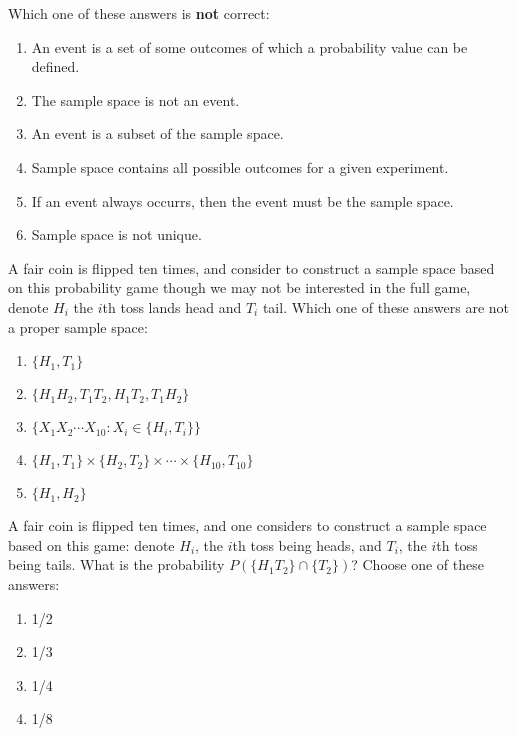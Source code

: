 \documentclass[poll_tutorial_format]{subfiles}
\begin{document}
	\begin{exercise}
	Which one of these answers is \textbf{not} correct: 
	\begin{enumerate}
		\item An event is a set of some outcomes of which a probability value can be defined.
		\item The sample space is not an event.
		\item An event is a subset of the sample space.
		\item Sample space contains all possible outcomes for a given experiment.
		\item If an event always occurrs, then the event must be the sample space.
		\item Sample space is not unique.
	\end{enumerate}
\end{exercise}

	
	\begin{exercise}
		A fair coin is flipped ten times, and  consider to construct a sample space based on this probability game though we may not be interested in the full game, denote $H_i$ the $i$th toss lands head and $T_i$ tail. 
		Which one of these answers are not a proper sample space:
		\begin{enumerate}
			\item $\{H_1, T_1\}$
			\item $\{H_1H_2, T_1T_2, H_1T_2, T_1H_2\}$
			\item $\{X_1X_2\cdots X_{10}: X_i \in \{H_i,T_i\}\}$
			\item $\{H_1, T_1\}\times\{H_2, T_2\}\times  \cdots \times \{H_{10}, T_{10}\}$
			\item $\{H_1, H_2\}$
		\end{enumerate}
	\end{exercise}
	
	\begin{exercise}
		A fair coin is flipped ten times, and one considers to construct a sample space based on this game: denote $H_i$, the $i$th toss being heads, and $T_i$, the $i$th toss being tails. What is the probability $P( \{H_1T_2\} \cap \{T_2\} )$?
		Choose one of these answers:
		\begin{enumerate}
			\item 1/2
			\item 1/3
			\item 1/4
			\item 1/8
		\end{enumerate}
	\end{exercise}
\end{document}
